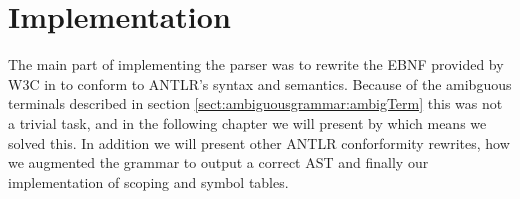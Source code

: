 \chapter{Implementation}


The main part of implementing the parser was to rewrite the EBNF provided by W3C in \cite{w3c01} to conform to ANTLR's syntax and semantics. Because of the amibguous terminals described in section \ref{sect:ambiguousgrammar:ambigTerm} this was not a trivial task, and in the following chapter we will present by which means we solved this. In addition we will present other ANTLR conforformity rewrites, how we augmented the grammar to output a correct AST and finally our implementation of scoping and symbol tables.








